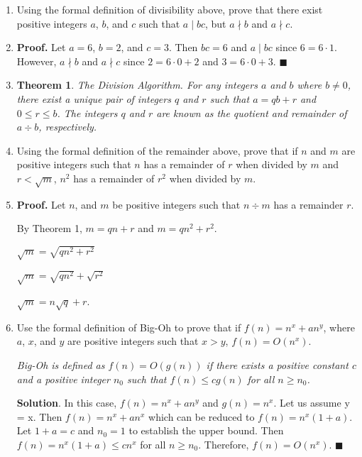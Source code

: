 \documentclass[12pt, letterpaper]{article}
\begin{document}
\begin{enumerate}
    \item Using the formal definition of divisibility above, prove that there exist positive integers $a$, $b$, and $c$ such that $a \mid bc$, but $a \nmid b$ and $a \nmid c$.

    \item[] \textbf{Proof.} Let $a = 6$, $b = 2$, and $c = 3$. Then $bc = 6$ and $a \mid bc$ since $6 = 6 \cdot 1$. However, $a \nmid b$ and $a \nmid c$ since $2 = 6 \cdot 0 + 2$ and $3 = 6 \cdot 0 + 3$. $\blacksquare$

    \item[] \textbf{Theorem 1}. \textit{The Division Algorithm. For any integers $a$ and $b$ where $b \neq 0$, there exist a unique pair of integers $q$ and $r$ such that $a = qb + r$ and $0 \leq r \leq b$.  The integers $q$ and $r$ are known as the quotient and remainder of $a \div b$, respectively.}

    \item Using the formal definition of the remainder above, prove that if $n$ and $m$ are positive integers such that $n$ has a remainder of $r$ when divided by $m$ and $r < \sqrt{m}$, $n^2$ has a remainder of $r^2$ when divided by $m$.

    \item[] \textbf{Proof.} Let $n$, and $m$ be positive integers such that $n \div m$ has a remainder $r$.
    
    By Theorem 1, $m = qn + r$ and $m = qn^2 + r^2$.  
    
    $\sqrt{m} = \sqrt{qn^2 + r^2}$
    
    $\sqrt{m} = \sqrt{qn^2} + \sqrt{r^2}$
    
    $\sqrt{m} = n\sqrt{q} + r$.
        
    \item Use the formal definition of Big-Oh to prove that if $f(n) = n^x + an^y$, where $a$, $x$, and $y$ are positive integers such that $x > y$, $f(n) = O(n^x)$.

    \textit{Big-Oh is defined as $f(n) = O(g(n))$ if there exists a positive constant $c$ and a positive integer $n_0$ such that $f(n) \leq cg(n)$ for all $n \geq n_0$.}

    \textbf{Solution}. In this case, $f(n) = n^x + an^y$ and $g(n) = n^x$. Let us assume y = x. Then $f(n) = n^x + an^x$ which can be reduced to $f(n) = n^x(1 + a)$.  Let $1+a = c$ and $n_0 = 1$ to establish the upper bound. Then $f(n) = n^x(1 + a) \leq cn^x$ for all $n \geq n_0$. Therefore, $f(n) = O(n^x)$. $\blacksquare$


\end{enumerate}
\end{document}
